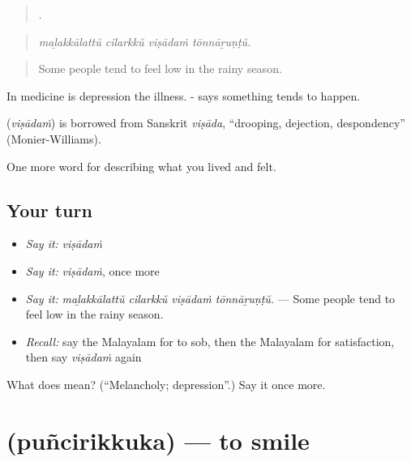 \begin{quote}
   .
\end{quote}

\begin{quote}
\emph{maḻakkālattŭ cilarkkŭ viṣādaṁ tōnnāṟuṇṭŭ.}
\end{quote}

\begin{quote}
Some people tend to feel low in the rainy season.
\end{quote}

In medicine  is depression the illness. - says something tends to happen.

\begin{cousinweb}
\textbf{} (\emph{viṣādaṁ}) is borrowed from Sanskrit \emph{viṣāda}, \textquotedblleft{}drooping, dejection, despondency\textquotedblright{} (Monier-Williams).
\end{cousinweb}

\begin{grammarlens}[title={What you've built}]
One more word for describing what you lived and felt.
\end{grammarlens}

\subsection*{Your turn}
\begin{itemize}
\raggedright
  \item \emph{Say it:} \emph{viṣādaṁ}
  \item \emph{Say it:} \emph{viṣādaṁ}, once more
  \item \emph{Say it:} \emph{maḻakkālattŭ cilarkkŭ viṣādaṁ tōnnāṟuṇṭŭ.} — Some people tend to feel low in the rainy season.
  \item \emph{Recall:} say the Malayalam for to sob, then the Malayalam for satisfaction, then say \emph{viṣādaṁ} again
\end{itemize}

\begin{tcolorbox}[breakable,colback=teal!4,colframe=teal!35!black,title={Before you move on}]
What does  mean? (\textquotedblleft{}Melancholy; depression\textquotedblright{}.) Say it once more.
\end{tcolorbox}
\section[\texorpdfstring{\ml{പുഞ്ചിരിക്കുക} (puñcirikkuka)}{പുഞ്ചിരിക്കുക (puñcirikkuka)}]{ (puñcirikkuka) — to smile}

